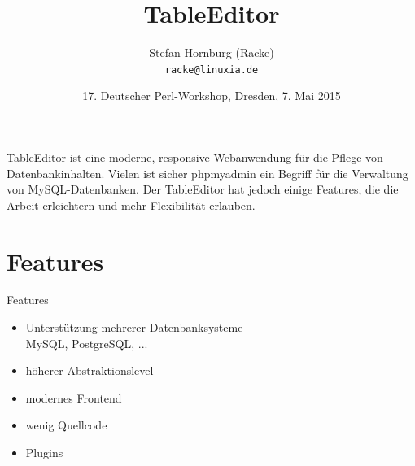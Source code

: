 \usepackage[utf8]{inputenc}
\usepackage[T1]{fontenc}
\usepackage{mathptmx}
\usepackage[scaled=.90]{helvet}
\usepackage{courier}
\usepackage{caption}
\captionsetup{labelformat=empty,labelsep=none}
\usepackage{verbatim}
\usepackage{hyperref}
\usepackage{listings}
\usepackage{ulem}
\lstset{language=Perl,basicstyle=\normalsize,tabsize=3,showstringspaces=false}

\newcommand {\framedgraphic}[2] {
    \begin{frame}{#1}
        \begin{center}
            \texttt{[image: \#2]}
        \end{center}
    \end{frame}
}


\title{TableEditor}
\author[racke]{Stefan Hornburg (Racke)\\ \texttt{racke@linuxia.de}}
\date{17. Deutscher Perl-Workshop, Dresden, 7. Mai 2015}


\maketitle{}

\begin{frame}
  \titlepage
\end{frame}

\tableofcontents

TableEditor ist eine moderne, responsive Webanwendung für die Pflege von
Datenbankinhalten. Vielen ist sicher phpmyadmin ein Begriff für die
Verwaltung von MySQL-Datenbanken. Der TableEditor hat jedoch einige
Features, die die Arbeit erleichtern und mehr Flexibilität erlauben.

\section{Features}
\begin{frame}{Features}
\begin{itemize}
\item Unterstützung mehrerer Datenbanksysteme \\
      MySQL, PostgreSQL, ...
\item höherer Abstraktionslevel
\item modernes Frontend
\item wenig Quellcode
\item Plugins
\end{itemize}
\end{frame}

